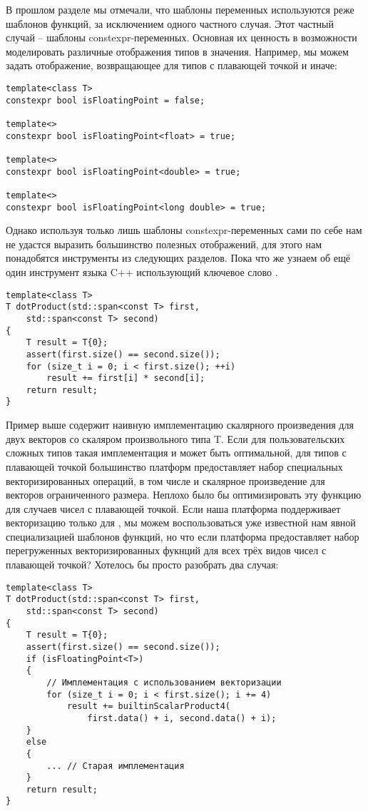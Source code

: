 В прошлом разделе мы отмечали, что шаблоны переменных используются реже шаблонов функций, за исключением одного частного случая. Этот частный случай -- шаблоны constexpr-переменных. Основная их ценность в возможности моделировать различные отображения типов в значения. Например, мы можем задать отображение, возвращающее  для типов с плавающей точкой и  иначе:
\begin{verbatim}
template<class T>
constexpr bool isFloatingPoint = false;

template<>
constexpr bool isFloatingPoint<float> = true;

template<>
constexpr bool isFloatingPoint<double> = true;

template<>
constexpr bool isFloatingPoint<long double> = true;
\end{verbatim}
Однако используя только лишь шаблоны constexpr-переменных сами по себе нам не удастся выразить большинство полезных отображений, для этого нам понадобятся инструменты из следующих разделов. Пока что же узнаем об ещё один инструмент языка C++ использующий ключевое слово .
\begin{verbatim}
template<class T>
T dotProduct(std::span<const T> first,
    std::span<const T> second)
{
    T result = T{0};
    assert(first.size() == second.size());
    for (size_t i = 0; i < first.size(); ++i)
        result += first[i] * second[i];
    return result;
}
\end{verbatim}
Пример выше содержит наивную имплементацию скалярного произведения для двух векторов со скаляром произвольного типа T. Если для пользовательских сложных типов  такая имплементация и может быть оптимальной, для типов с плавающей точкой большинство платформ предоставляет набор специальных векторизированных операций, в том числе и скалярное произведение для векторов ограниченного размера. Неплохо было бы оптимизировать эту функцию для случаев чисел с плавающей точкой. Если наша платформа поддерживает векторизацию только для , мы можем воспользоваться уже известной нам явной специализацией шаблонов функций, но что если платформа предоставляет набор перегруженных векторизированных фукнций для всех трёх видов чисел с плавающей точкой? Хотелось бы просто разобрать два случая: 
\begin{verbatim}
template<class T>
T dotProduct(std::span<const T> first,
    std::span<const T> second)
{
    T result = T{0};
    assert(first.size() == second.size());
    if (isFloatingPoint<T>)
    {
        // Имплементация с использованием векторизации
        for (size_t i = 0; i < first.size(); i += 4)
            result += builtinScalarProduct4(
                first.data() + i, second.data() + i);
    }
    else
    {
        ... // Старая имплементация
    }
    return result;
}
\end{verbatim}
